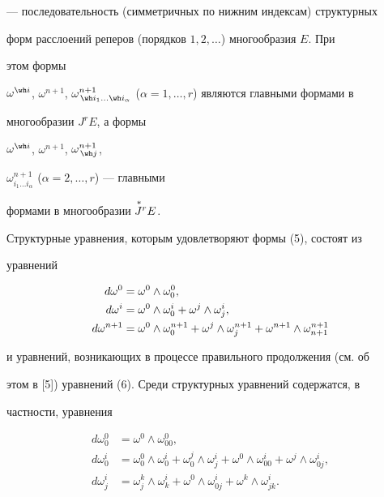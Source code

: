 --- последовательность (симметричных по нижним индексам) структурных 


форм расслоений реперов (порядков $1,2,\dotsc$) многообразия $E$. При 


этом формы 


$\omega^{\wh i}$, $\omega^{n+1}$, $\omega^{n+1}_{\,\wh i_1\dotsc\wh 


i_\alpha}$ ($\alpha=1,\dotsc,r$) являются главными формами в 


многообразии $J^r E$, а формы 


$\omega^{\wh i}$, $\omega^{n+1}$, $\omega^{n+1}_{\,\wh j}$, 


$\omega^{n+1}_{i_1\dotsc i_\alpha}$ ($\alpha=2,\dotsc,r$) --- главными 


формами в многообразии $\overset{\,*}{J}{}^r E$. 


Структурные уравнения, которым удовлетворяют формы (5), состоят из 


уравнений 


\begin{align} 


d\omega^0&=\omega^0\wedge\omega^0_0,\notag\\ 


d\omega^i&=\omega^0\wedge\omega^i_0+\omega^j\wedge\omega^i_j,\\ 


d\omega^{n+1}&=\omega^0\wedge\omega^{n+1}_0+ 


\omega^j\wedge\omega^{n+1}_j+\omega^{n+1}\wedge 


\omega^{n+1}_{n+1}\notag 


\end{align} 


и уравнений, возникающих в процессе правильного продолжения (см. об 


этом в [5]) уравнений (6). Среди структурных уравнений содержатся, в 


частности, уравнения 


\begin{align*} 


d\omega^0_0&=\omega^0\wedge\omega^0_{00},\\ 


d\omega^i_0&=\omega^0_0\wedge\omega^i_0+ 


\omega^j_0\wedge\omega^i_j+\omega^0\wedge\omega^i_{00}+ 


\omega^j\wedge\omega^i_{0j},\\ 


d\omega^i_j&=\omega^k_j\wedge\omega^i_k+ 


\omega^0\wedge\omega^i_{0j}+\omega^k\wedge\omega^i_{jk}. 


\end{align*} 


